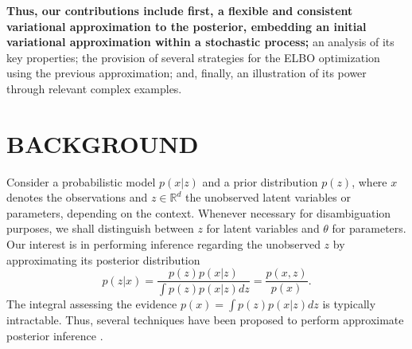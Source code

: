 
{\bf Thus, our contributions include first, a flexible and consistent variational approximation to the posterior,
embedding an initial variational approximation within a stochastic process;} %
an analysis of its key properties; %
    the provision of several strategies for the ELBO
    optimization using the previous 
    approximation; and, finally, 
    an illustration of its power through relevant complex examples.


 



\section{BACKGROUND}
Consider a probabilistic model $p(x|z)$ and a prior distribution $p(z)$, where $x$ denotes the observations and $z \in \mathbb{R}^d$ the unobserved latent variables or parameters, depending on the context. Whenever necessary for disambiguation
purposes, we shall distinguish between $z$ for latent variables and $\theta$ for parameters. Our interest is in performing inference regarding the unobserved $z$ by approximating its posterior distribution
$$
p(z| x) = \frac{ p(z)p(x| z) }{ \int p(z)p(x| z) dz} = %
\frac{p(x, z)}{p(x)}.
$$
The integral assessing the evidence $p(x) = \int p(z)p(x| z) dz$ is typically intractable. %
Thus, several techniques have been proposed to perform approximate posterior inference {\bf \cite{alquier2020approximate}}.



